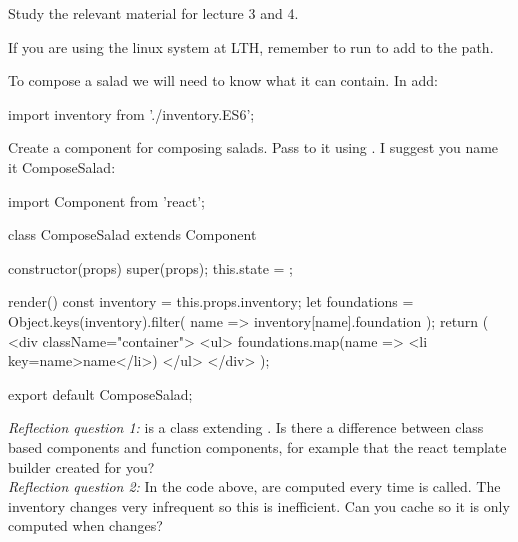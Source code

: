 \documentclass[fleqn, article, a4paper]{memoir}
\begin{document}
\begin{Assignments}

\item Study the relevant material for lecture 3 and 4.

\item If you are using the linux system at LTH, remember to run  to add  to the path.

\item To compose a salad we will need to know what it can contain. In  add:
\begin{Code}
import inventory from './inventory.ES6';
\end{Code}

\item Create a component for composing salads. Pass  to it using . I suggest you name it ComposeSalad:
\begin{Code}
import { Component } from 'react';

class ComposeSalad extends Component {
  constructor(props) {
    super(props);
    this.state = {};
  }

  render() {
    const inventory = this.props.inventory;
    let foundations = Object.keys(inventory).filter(
      name => inventory[name].foundation
    );
    return (
      <div className="container">
        <ul>
          {foundations.map(name => <li key={name}>{name}</li>)}
        </ul>
      </div>
    );
  }
}

export default ComposeSalad;
\end{Code}
\emph{Reflection question 1:}  is a class extending . Is there a difference between class based components and function components, for example  that the react template builder created for you?
\\\emph{Reflection question 2:} In the code above,  are computed every time  is called. The inventory changes very infrequent so this is inefficient. Can you cache  so it is only computed when  changes?


\end{Assignments}
\end{document}
